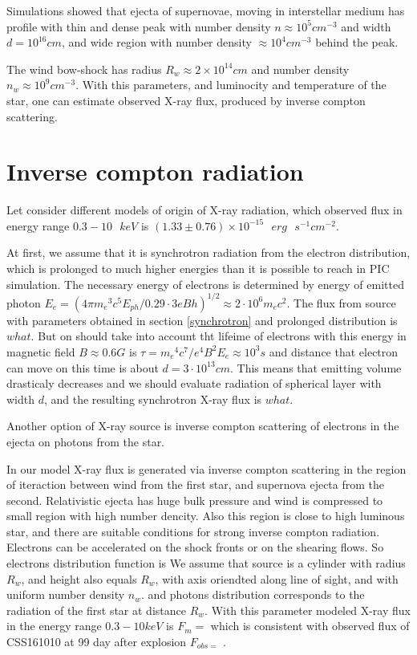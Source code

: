 \documentclass[a4paper,12pt]{extreport}
\begin{document}
Simulations showed that ejecta of supernovae, moving in interstellar medium has profile with thin and dense peak with number density $n \approx 10^5 cm^{-3}$ and width $d = 10^{16} cm$, and wide region with number density $\approx 10^4 cm^{-3}$ behind the peak.

The wind bow-shock has radius $R_w \approx 2\times10^{14} cm$ and number density $n_w \approx 10^9 cm^{-3}$. With this parameters, and luminocity and temperature of the star, one can estimate observed X-ray flux, produced by inverse compton scattering.
 
\section{Inverse compton radiation}\label{compton}

Let consider different models of origin of X-ray radiation, which observed flux in energy range $0.3 - 10\text{ }keV$ is $(1.33 \pm 0.76) \times 10^{-15}\text{ }erg\text{ }s^{-1} cm^{-2}$.

At first, we assume that it is synchrotron radiation from the electron distribution, which is prolonged to much higher energies than it is possible to reach in PIC simulation. The necessary energy of electrons is determined by energy of emitted photon $E_e = (4\pi{m_e}^3 c^5 E_{ph}/0.29\cdot3 e B h)^{1/2} \approx 2\cdot10^6 m_e c^2$. The flux from source with parameters obtained in section \ref{synchrotron} and prolonged distribution is $what$. But on should take into account tht lifeime of electrons with this energy in magnetic field $B \approx 0.6 G$ is $\tau = {m_e}^4 c^7 / e^4 B^2 E_e \approx 10^3 s$ and distance that electron can move on this time is about $d = 3\cdot10^13 cm$. This means that emitting volume drasticaly decreases and we should evaluate radiation of spherical layer with width $d$, and the resulting synchrotron X-ray flux is $what$.

Another option of X-ray source is inverse compton scattering of electrons in the ejecta on photons from the star.

In our model X-ray flux is generated via inverse compton scattering in the region of iteraction between wind from the first star, and supernova ejecta from the second. Relativistic ejecta has huge bulk pressure and wind is compressed to small region with high number dencity. Also this region is close to high luminous star, and there are suitable conditions for strong inverse compton radiation. Electrons can be accelerated on the shock fronts or on the shearing flows. So electrons distribution function is 
We assume that source is a cylinder with radius $R_w$, and height also equals $R_w$, with axis oriendted along line of sight, and with uniform number density $n_w$. 
and photons distribution corresponds to the radiation of the first star at distance $R_w$. With this parameter modeled X-ray flux in the energy range $0.3-10 keV$ is $F_m = $ which is consistent with observed flux of CSS161010 at 99 day after explosion $F_{obs = }$ \cite{Coppejans2020}.



\end{document}
